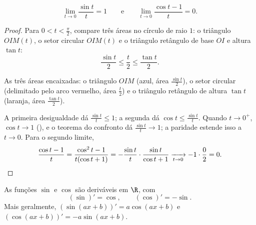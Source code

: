 \begin{lemma}\label{lem:g12:trigo:sinxx}
\[
\lim_{t \to 0} \frac{\sin t}{t} = 1
\qquad\text{e}\qquad
\lim_{t \to 0} \frac{\cos t - 1}{t} = 0 .
\]
\end{lemma}

\begin{proof}
Para $0 < t < \frac{\pi}{2}$, compare três áreas no círculo de raio $1$: o
triângulo $OIM(t)$, o setor circular $OIM(t)$ e o triângulo retângulo de
base $OI$ e altura $\tan t$:
\[
\frac{\sin t}{2} \leq \frac{t}{2} \leq \frac{\tan t}{2}.
\]

\begin{omfigure}

{\small As três áreas encaixadas: o triângulo $OIM$ (azul, área
$\frac{\sin t}{2}$), o setor circular (delimitado pelo arco vermelho,
área $\frac{t}{2}$) e o triângulo retângulo de altura $\tan t$ (laranja,
área $\frac{\tan t}{2}$).}
\end{omfigure}

A primeira desigualdade dá $\frac{\sin t}{t} \leq 1$; a segunda dá
$\cos t \leq \frac{\sin t}{t}$. Quando $t \to 0^+$, $\cos t \to 1$
(), e o teorema do confronto dá $\frac{\sin t}{t} \to 1$; a
paridade estende isso a $t \to 0$. Para o segundo limite,
\[
\frac{\cos t - 1}{t} = \frac{\cos^2 t - 1}{t(\cos t + 1)}
= -\frac{\sin t}{t}\cdot\frac{\sin t}{\cos t + 1}
\xrightarrow[t\to0]{} -1 \cdot \frac{0}{2} = 0. \qedhere
\]
\end{proof}

\begin{theorem}\label{thm:g12:trigo:derivatives}
As funções $\sin$ e $\cos$ são deriváveis em $\R$, com
\[
(\sin)' = \cos, \qquad (\cos)' = -\sin .
\]
Mais geralmente, $(\sin(ax+b))' = a\cos(ax+b)$ e
$(\cos(ax+b))' = -a\sin(ax+b)$.
\end{theorem}

